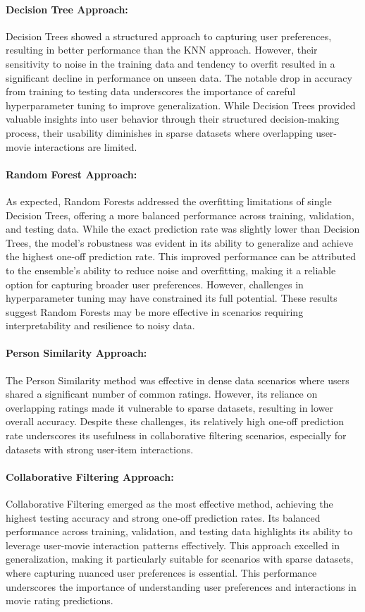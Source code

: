 \documentclass[a4paper,9pt]{article}
\begin{document}
\paragraph{Decision Tree Approach:}
Decision Trees showed a structured approach to capturing user preferences, resulting in better performance than the KNN approach.
However, their sensitivity to noise in the training data and tendency to overfit resulted in a significant decline in performance on unseen data.
The notable drop in accuracy from training to testing data underscores the importance of careful hyperparameter tuning to improve generalization.
While Decision Trees provided valuable insights into user behavior through their structured decision-making process, their usability diminishes in sparse datasets where overlapping user-movie interactions are limited.

\paragraph{Random Forest Approach:}
As expected, Random Forests addressed the overfitting limitations of single Decision Trees, offering a more balanced performance across training, validation, and testing data.
While the exact prediction rate was slightly lower than Decision Trees, the model's robustness was evident in its ability to generalize and achieve the highest one-off prediction rate.
This improved performance can be attributed to the ensemble's ability to reduce noise and overfitting, making it a reliable option for capturing broader user preferences.
However, challenges in hyperparameter tuning may have constrained its full potential.
These results suggest Random Forests may be more effective in scenarios requiring interpretability and resilience to noisy data.

\paragraph{Person Similarity Approach:}
The Person Similarity method was effective in dense data scenarios where users shared a significant number of common ratings.
However, its reliance on overlapping ratings made it vulnerable to sparse datasets, resulting in lower overall accuracy.
Despite these challenges, its relatively high one-off prediction rate underscores its usefulness in collaborative filtering scenarios, especially for datasets with strong user-item interactions.

\paragraph{Collaborative Filtering Approach:}
Collaborative Filtering emerged as the most effective method, achieving the highest testing accuracy and strong one-off prediction rates.
Its balanced performance across training, validation, and testing data highlights its ability to leverage user-movie interaction patterns effectively.
This approach excelled in generalization, making it particularly suitable for scenarios with sparse datasets, where capturing nuanced user preferences is essential.
This performance underscores the importance of understanding user preferences and interactions in movie rating predictions.
\end{document}
